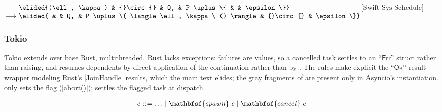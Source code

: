 \vspace{1em}
\noindent
$\begin{array}[t]{@{}r@{\ }l@{}l@{}l@{\ }l@{}l@{}l@{}}
                & \elided{(\ell, \kappa) & {}\circ{} & Q, & P \uplus \{ & & \epsilon \}} \\
\longrightarrow & \elided{               &           & Q, & P \uplus \{ \langle \ell, \kappa\ () \rangle & {}\circ{} & \epsilon \}}
\end{array}$\hfill$\text{[Swift-Sys-Schedule]}$\par
\vspace{0.7em}
\subsubsection{Tokio}

Tokio extends \lasync over base Rust, multithreaded. Rust lacks exceptions: failures are values, so a cancelled task settles to an $\textsf{``Err''}$ struct rather than raising, and  resumes dependents by direct application of the continuation rather than by . The rules make explicit the $\textsf{``Ok''}$ result wrapper modeling Rust's \code|JoinHandle| results, which the main text elides; the gray fragments of  are present only in Asyncio's instantiation.  only sets the flag (\code|abort()|);  settles the flagged task at dispatch.

$$
\begin{array}{r@{\ }c@{\ }l}
e & ::= & \ldots \mid \mathbfsf{spawn}\ e \mid \mathbfsf{cancel}\ e
\end{array}
$$

